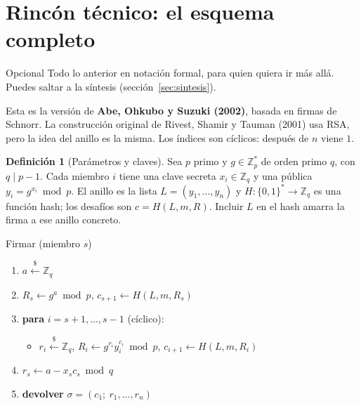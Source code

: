\documentclass[11pt,a4paper]{article}
\theoremstyle{definition}
\newtheorem{definicion}{Definición}
\theoremstyle{plain}
\theoremstyle{remark}
\newcommand{\Zq}{\mathbb{Z}_q}
\newcommand{\azar}{\xleftarrow{\$}}
\begin{document}
\section{Rincón técnico: el esquema completo}\label{sec:formulas}

\begin{nota}{Opcional}
Todo lo anterior en notación formal, para quien quiera ir más allá. Puedes saltar a
la síntesis (sección~\ref{sec:sintesis}).
\end{nota}

Esta es la versión de \textbf{Abe, Ohkubo y Suzuki (2002)}, basada en firmas de
Schnorr. La construcción original de Rivest, Shamir y Tauman (2001) usa RSA, pero la
idea del anillo es la misma. Los índices son cíclicos: después de $n$ viene $1$.

\begin{definicion}[Parámetros y claves]
Sea $p$ primo y $g \in \mathbb{Z}_p^{*}$ de orden primo $q$, con $q \mid p-1$. Cada
miembro $i$ tiene una clave secreta $x_i \in \Zq$ y una pública
$y_i = g^{x_i} \bmod p$. El anillo es la lista $L = (y_1,\dots,y_n)$ y
$H : \{0,1\}^{*} \to \Zq$ es una función hash; los desafíos son
$c = H(L, m, R)$. Incluir $L$ en el hash amarra la firma a ese anillo concreto.
\end{definicion}

\begin{algoritmo}{Firmar (miembro $s$)}
\begin{enumerate}[leftmargin=1.6em,itemsep=0.15em,label=\arabic*:]
  \item $a \azar \Zq$
  \item $R_s \gets g^{a} \bmod p$, \quad $c_{s+1} \gets H(L, m, R_s)$
  \item \textbf{para} $i = s+1, \dots, s-1$ (cíclico):
  \begin{itemize}[leftmargin=1.4em,label={}]
    \item $r_i \azar \Zq$, \quad $R_i \gets g^{r_i} y_i^{c_i} \bmod p$, \quad
          $c_{i+1} \gets H(L, m, R_i)$
  \end{itemize}
  \item $r_s \gets a - x_s c_s \bmod q$
  \item \textbf{devolver} $\sigma = (c_1;\ r_1, \dots, r_n)$
\end{enumerate}
\end{algoritmo}
\end{document}

